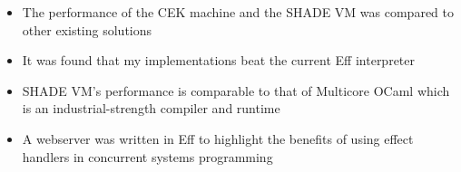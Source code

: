 \documentclass[class=article, crop=false]{standalone}
\begin{document}
\begin{itemize}
    \item The performance of the CEK machine and the SHADE VM was compared to
    other existing solutions
    \item It was found that my implementations beat the current Eff interpreter
    \item SHADE VM's performance is comparable to that of Multicore OCaml which
    is an industrial-strength compiler and runtime
    \item A webserver was written in Eff to highlight the benefits of using
    effect handlers in concurrent systems programming
\end{itemize}
\end{document}

